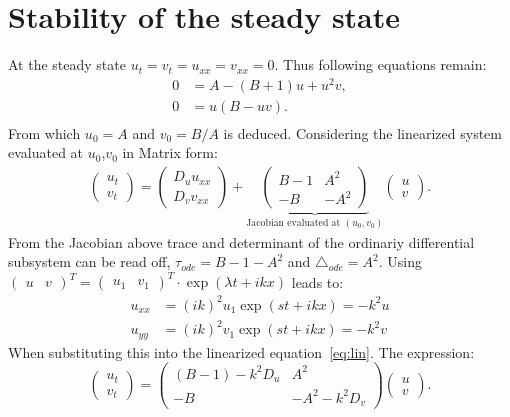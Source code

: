 \section{Stability of the steady state}
At the steady state $u_t = v_t = u_{xx} = v_{xx} = 0$. Thus following equations remain:
\begin{align}
0 &= A - (B + 1)u + u^2v, \\
0 &= u(B - uv). \\
\end{align}
From which $u_0 = A$ and $v_0 = B/A$ is deduced. Considering the linearized system evaluated at $u_0$,$v_0$ in Matrix form:
\begin{align}
\begin{pmatrix}
u_t \\ v_t
\end{pmatrix} =
\begin{pmatrix}
D_u u_{xx} \\ D_v v_{xx}
\end{pmatrix} +
\underbrace{\begin{pmatrix}
B-1 & A^2 \\
-B & -A^2
\end{pmatrix}}_\text{Jacobian evaluated at $(u_0,v_0)$}
\begin{pmatrix}
u \\ v
\end{pmatrix}. 
\label{eq:lin} 
\end{align}
From the Jacobian above trace and determinant of the ordinariy differential subsystem can be read off, $\tau_{ode} = B - 1 - A^2$ and $\triangle_{ode} = A^2$.
Using $\begin{pmatrix} u & v \end{pmatrix}^T = \begin{pmatrix} u_1 & v_1 \end{pmatrix}^T \cdot \exp(\lambda t + ikx)$ leads to:
\begin{align}
u_{xx} &= (ik)^2 u_1 \exp(s t + ikx) = -k^2u \\
u_{yy} &= (ik)^2 v_1 \exp(s t + ikx) = -k^2v
\end{align}
When substituting this into the linearized equation~\ref{eq:lin}. The expression:
\begin{equation}
\begin{pmatrix}
u_t \\ v_t
\end{pmatrix} =
\begin{pmatrix}
(B - 1)-k^2 D_u & A^2 \\
-B & -A^2-k^2 D_v
\end{pmatrix}
\begin{pmatrix}
u \\ v
\end{pmatrix}.
\end{equation}
